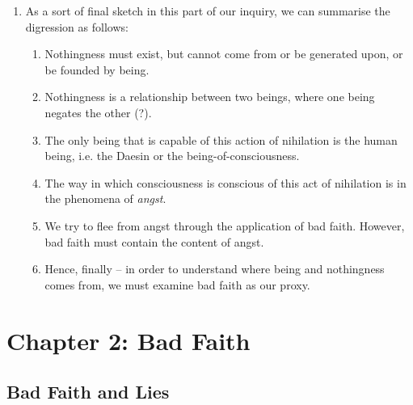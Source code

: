 \begin{enumerate}
\begin{enumerate}
  \end{enumerate}
  \item As a sort of final sketch in this part of our inquiry, we can summarise the digression as follows:
  \begin{enumerate}
    \item Nothingness must exist, but cannot come from or be generated upon, or be founded by being.
    \item Nothingness is a relationship between two beings, where one being negates the other (?).
    \item The only being that is capable of this action of nihilation is the human being, i.e. the Daesin or the being-of-consciousness.
    \item The way in which consciousness is conscious of this act of nihilation is in the phenomena of \emph{angst}.
    \item We try to flee from angst through the application of bad faith. However, bad faith must contain the content of angst.
    \item Hence, finally -- in order to understand where being and nothingness comes from, we must examine bad faith as our proxy.
  \end{enumerate}
\end{enumerate}

\section{Chapter 2: Bad Faith}

\subsection{Bad Faith and Lies}

